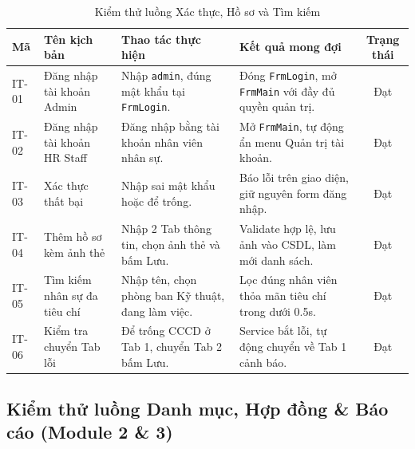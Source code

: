 \documentclass[12pt,a4paper]{report}
\begin{document}
\begin{table}[htbp]
\centering
\small
\begin{tabularx}{\textwidth}{|l|p{3.5cm}|p{3.8cm}|p{3.8cm}|c|}
\hline
\textbf{Mã} & \textbf{Tên kịch bản} & \textbf{Thao tác thực hiện} & \textbf{Kết quả mong đợi} & \textbf{Trạng thái} \\ \hline
IT-01 & Đăng nhập tài khoản Admin & Nhập \texttt{admin}, đúng mật khẩu tại \texttt{FrmLogin}. & Đóng \texttt{FrmLogin}, mở \texttt{FrmMain} với đầy đủ quyền quản trị. & Đạt \\ \hline
IT-02 & Đăng nhập tài khoản HR Staff & Đăng nhập bằng tài khoản nhân viên nhân sự. & Mở \texttt{FrmMain}, tự động ẩn menu Quản trị tài khoản. & Đạt \\ \hline
IT-03 & Xác thực thất bại & Nhập sai mật khẩu hoặc để trống. & Báo lỗi trên giao diện, giữ nguyên form đăng nhập. & Đạt \\ \hline
IT-04 & Thêm hồ sơ kèm ảnh thẻ & Nhập 2 Tab thông tin, chọn ảnh thẻ và bấm Lưu. & Validate hợp lệ, lưu ảnh vào CSDL, làm mới danh sách. & Đạt \\ \hline
IT-05 & Tìm kiếm nhân sự đa tiêu chí & Nhập tên, chọn phòng ban Kỹ thuật, đang làm việc. & Lọc đúng nhân viên thỏa mãn tiêu chí trong dưới 0.5s. & Đạt \\ \hline
IT-06 & Kiểm tra chuyển Tab lỗi & Để trống CCCD ở Tab 1, chuyển Tab 2 bấm Lưu. & Service bắt lỗi, tự động chuyển về Tab 1 cảnh báo. & Đạt \\ \hline
\end{tabularx}
\caption{Kiểm thử luồng Xác thực, Hồ sơ và Tìm kiếm}
\end{table}

\subsection{Kiểm thử luồng Danh mục, Hợp đồng \& Báo cáo (Module 2 \& 3)}
\end{document}
